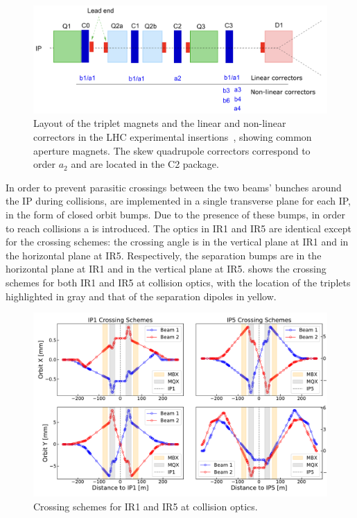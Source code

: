 \begin{figure}[!hbt]
  \centering
  \includegraphics*[width=0.92\linewidth]{Figures/Optics_Measurements_Corrections_at_LHC/corrector_package.png}
  \caption{Layout of the triplet magnets and the linear and non-linear correctors in the LHC experimental insertions~\cite{CERN:Bruning:Dynap_Studies}, showing common aperture magnets. The skew quadrupole correctors correspond to order \(a_2\) and are located in the C\num{2} package.}
  \label{figure:lhc_ir_corrector_layout}
\end{figure}

In order to prevent parasitic crossings between the two beams' bunches around the IP during collisions,  are implemented in a single transverse plane for each IP, in the form of closed orbit bumps.
Due to the presence of these bumps, in order to reach collisions a  is introduced.
The optics in IR\num{1} and IR\num{5} are identical except for the crossing schemes: the crossing angle is in the vertical plane at IR\num{1} and in the horizontal plane at IR\num{5}.
Respectively, the separation bumps are in the horizontal plane at IR\num{1} and in the vertical plane at IR\num{5}.
 shows the crossing schemes for both IR\num{1} and IR\num{5} at collision optics, with the location of the triplets highlighted in gray and that of the separation dipoles in yellow.

\begin{figure}[!hbt]
  \centering
  \includegraphics*[width=0.99\linewidth]{Figures/Optics_Measurements_Corrections_at_LHC/lhc_crossing_schemes_ip15.pdf}
  \caption{Crossing schemes for IR\num{1} and IR\num{5} at collision optics.}
  \label{figure:lhc_crossing_schemes_ip15}
\end{figure}

